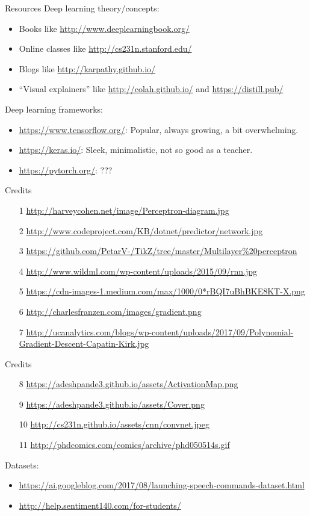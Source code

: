 \documentclass{beamer}
\begin{document}
\begin{frame}{Resources}
Deep learning theory/concepts:
\begin{itemize}
\item Books like \url{http://www.deeplearningbook.org/}
\item Online classes like \url{http://cs231n.stanford.edu/}
\item Blogs like \url{http://karpathy.github.io/}
\item ``Visual explainers'' like \url{http://colah.github.io/} and \url{https://distill.pub/}
\end{itemize}\medskip

Deep learning frameworks:
\begin{itemize}
\item \url{https://www.tensorflow.org/}: Popular, always growing, a bit overwhelming.
\item \url{https://keras.io/}: Sleek, minimalistic, not so good as a teacher.
\item \url{https://pytorch.org/}: ???
\end{itemize}
\end{frame}


\begin{frame}{Credits}
\begin{itemize}
\item [1] \url{http://harveycohen.net/image/Perceptron-diagram.jpg}
\item [2] \url{http://www.codeproject.com/KB/dotnet/predictor/network.jpg}
\item [3] \url{https://github.com/PetarV-/TikZ/tree/master/Multilayer\%20perceptron}
\item [4] \url{http://www.wildml.com/wp-content/uploads/2015/09/rnn.jpg}
\item [5] \url{https://cdn-images-1.medium.com/max/1000/0*rBQI7uBhBKE8KT-X.png}
\item [6] \url{http://charlesfranzen.com/images/gradient.png}
\item [7] \url{http://ucanalytics.com/blogs/wp-content/uploads/2017/09/Polynomial-Gradient-Descent-Capatin-Kirk.jpg}
\end{itemize}
\end{frame}


\begin{frame}{Credits}
\begin{itemize}
\item [8] \url{https://adeshpande3.github.io/assets/ActivationMap.png}
\item [9] \url{https://adeshpande3.github.io/assets/Cover.png}
\item [10] \url{http://cs231n.github.io/assets/cnn/convnet.jpeg}
\item [11] \url{http://phdcomics.com/comics/archive/phd050514s.gif}
\end{itemize}

Datasets:
\begin{itemize}
\item \url{https://ai.googleblog.com/2017/08/launching-speech-commands-dataset.html}
\item \url{http://help.sentiment140.com/for-students/}
\end{itemize}
\end{frame}
\end{document}
